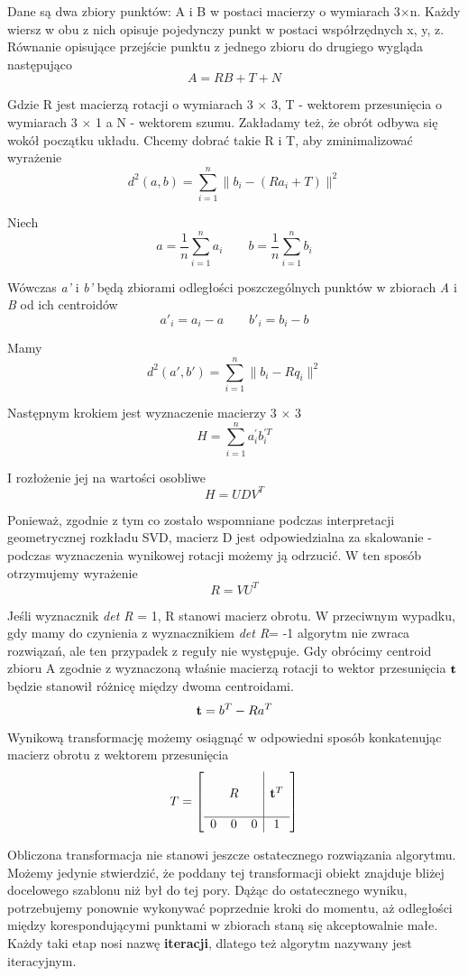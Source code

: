\documentclass{article}
\begin{document}
Dane są dwa zbiory punktów: A i B w postaci macierzy o wymiarach 3$\times$n. Każdy wiersz w obu z nich opisuje pojedynczy punkt w postaci współrzędnych x, y, z. Równanie opisujące przejście punktu z jednego zbioru do drugiego wygląda następująco
\[A = R B + T + N \]

Gdzie R jest macierzą rotacji o wymiarach 3 $\times$ 3, T - wektorem przesunięcia o wymiarach 3 $\times$ 1 a N - wektorem szumu. Zakładamy też, że obrót odbywa się wokół początku układu. Chcemy dobrać takie R i T, aby zminimalizować wyrażenie
\[ d^2(a, b) = \sum_{i=1}^n \| b_{i} - (Ra_i+T)\|^2 \]

Niech 
\[a = \frac{1}{n} \sum_{i=1}^n a_i \qquad b = \frac{1}{n} \sum_{i=1}^n b_i \]

Wówczas \emph{a'} i \emph{b'} będą zbiorami odległości poszczególnych punktów w zbiorach \emph{A} i \emph{B} od ich centroidów
\[a'_i = a_i - a \qquad b'_i = b_i - b \]

Mamy
\[d^2(a', b') = \sum_{i=1}^n \| b_{i} - Rq_{i}\|^2 \]

Następnym krokiem jest wyznaczenie macierzy 3 $\times$ 3 
\[H = \sum_{i=1}^n a_i^{'} b_{i}^{'T} \]

I rozłożenie jej na wartości osobliwe
\[H = UDV^T \]

Ponieważ, zgodnie z tym co zostało wspomniane podczas interpretacji geometrycznej rozkładu SVD, macierz D jest odpowiedzialna za skalowanie - podczas wyznaczenia wynikowej rotacji możemy ją odrzucić. W ten sposób otrzymujemy wyrażenie
\[R = VU^T \]

Jeśli wyznacznik \emph{det R} = 1, R stanowi macierz obrotu. W przeciwnym wypadku, gdy mamy do czynienia z wyznacznikiem \emph{det R}= -1 algorytm nie zwraca rozwiązań, ale ten przypadek z reguły nie występuje. Gdy obrócimy centroid zbioru A zgodnie z wyznaczoną właśnie macierzą rotacji to wektor przesunięcia $\vb{t}$ będzie stanowił różnicę między dwoma centroidami.
\[\vb{t} = b^T - R a^T \]

Wynikową transformację możemy osiągnąć w odpowiedni sposób konkatenując macierz obrotu z wektorem przesunięcia
\[T = \left[
\begin{array}{ccc|c}
& & & \\
& R & & \vb{t}^T \\
& & & \\
\hline
0 & 0 & 0 & 1
\end{array}
\right]
\]

Obliczona transformacja nie stanowi jeszcze ostatecznego rozwiązania algorytmu. Możemy jedynie stwierdzić, że poddany tej transformacji obiekt znajduje bliżej docelowego szablonu niż był do tej pory. Dążąc do ostatecznego wyniku, potrzebujemy ponownie wykonywać poprzednie kroki do momentu, aż odległości między korespondującymi punktami w zbiorach staną się akceptowalnie małe. Każdy taki etap nosi nazwę \textbf{iteracji}, dlatego też algorytm nazywany jest iteracyjnym.
\end{document}
